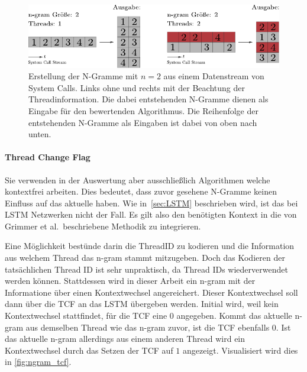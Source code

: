                 \begin{figure}
                    \includegraphics[width=\textwidth]{images/ngram.pdf}
                    \caption[Erstellung N-Gramme]{Erstellung der N-Gramme mit $n=2$ aus einem Datenstream von System Calls.
                        Links ohne und rechts mit der Beachtung der Threadinformation.
                        Die dabei entstehenden N-Gramme dienen als Eingabe für den bewertenden Algorithmus.
                        Die Reihenfolge der entstehenden N-Gramme als Eingaben ist dabei von oben nach unten.
                    }\label{fig:ngram_thread}
                \end{figure}

            \paragraph{Thread Change Flag}
                Sie verwenden in der Auswertung aber ausschließlich Algorithmen welche kontextfrei arbeiten.
                Dies bedeutet, dass zuvor gesehene N-Gramme keinen Einfluss auf das aktuelle haben.
                Wie in~\autoref{sec:LSTM} beschrieben wird, ist das bei \ac{LSTM} Netzwerken nicht der Fall.
                Es gilt also den benötigten Kontext in die von Grimmer et al.\ beschriebene Methodik zu integrieren.

                Eine Möglichkeit bestünde darin die ThreadID zu kodieren und die Information aus welchem Thread das n-gram stammt mitzugeben.
                Doch das Kodieren der tatsächlichen Thread ID ist sehr unpraktisch, da Thread IDs wiederverwendet werden können.
                Stattdessen wird in dieser Arbeit ein n-gram mit der Informatione über einen Kontextwechsel angereichert. 
                Dieser Kontextwechsel soll dann über die \ac{TCF} an das \ac{LSTM} übergeben werden.
                Initial wird, weil kein Kontextwechsel stattfindet, für die \ac{TCF} eine $0$ angegeben.
                Kommt das aktuelle n-gram aus demselben Thread wie das n-gram zuvor, ist die \ac{TCF} ebenfalls $0$.
                Ist das aktuelle n-gram allerdings aus einem anderen Thread wird ein Kontextwechsel durch das Setzen der \ac{TCF} auf $1$ angezeigt.
                Visualisiert wird dies in \autoref{fig:ngram_tcf}.

